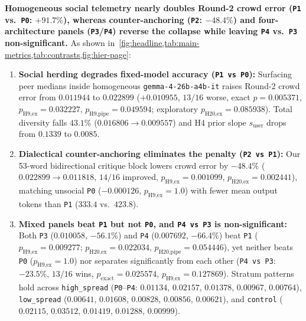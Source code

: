 \documentclass[11pt,letterpaper]{article}
\theoremstyle{plain}
\newcommand{\code}[1]{\nolinkurl{#1}}
\begin{document}
\noindent\textbf{Homogeneous social telemetry nearly doubles Round-2 crowd error (\texttt{P1} vs.\ \texttt{P0}: $+91.7\%$), whereas counter-anchoring (\texttt{P2}: $-48.4\%$) and four-architecture panels (\texttt{P3}/\texttt{P4}) reverse the collapse while leaving \texttt{P4} vs.\ \texttt{P3} non-significant.} As shown in~\cref{fig:headline,tab:main-metrics,tab:contrasts,fig:hier-page}:
\begin{enumerate}
  \item \textbf{Social herding degrades fixed-model accuracy (\texttt{P1 vs P0}):} Surfacing peer medians inside homogeneous \texttt{gemma-4-26b-a4b-it} raises Round-2 crowd error from $0.011944$ to $0.022899$ ($+0.010955$, $13/16$ worse, exact $p=0.005371$, $p_{\text{H9,ex}}=0.032227$, $p_{\text{H9,pipe}}=0.049594$; exploratory $p_{\text{H20,ex}}=0.085938$). Total diversity falls $43.1\%$ ($0.016806 \to 0.009557$) and H4 prior slope $s_{\text{user}}$ drops from $0.1339$ to $0.0085$.
  \item \textbf{Dialectical counter-anchoring eliminates the penalty (\texttt{P2 vs P1}):} Our 53-word bidirectional critique block lowers crowd error by $-48.4\%$ ($0.022899 \to 0.011818$, $14/16$ improved, $p_{\text{H9,ex}}=0.001099$, $p_{\text{H20,ex}}=0.002441$), matching unsocial \texttt{P0} ($-0.000126$, $p_{\text{H9,ex}}=1.0$) with fewer mean output tokens than \texttt{P1} ($333.4$ vs.\ $423.8$).
  \item \textbf{Mixed panels beat \texttt{P1} but not \texttt{P0}, and \texttt{P4 vs P3} is non-significant:} Both \texttt{P3} ($0.010058$, $-56.1\%$) and \texttt{P4} ($0.007692$, $-66.4\%$) beat \texttt{P1} ($p_{\text{H9,ex}}=0.009277$; $p_{\text{H20,ex}}=0.022034$, $p_{\text{H20,pipe}}=0.054446$), yet neither beats \texttt{P0} ($p_{\text{H9,ex}}=1.0$) nor separates significantly from each other (\texttt{P4 vs P3}: $-23.5\%$, $13/16$ wins, $p_{\text{exact}}=0.025574$, $p_{\text{H9,ex}}=0.127869$). Stratum patterns hold across \code{high\_spread} (\texttt{P0}--\texttt{P4}: $0.01134$, $0.02157$, $0.01378$, $0.00967$, $0.00764$), \code{low\_spread} ($0.00641$, $0.01608$, $0.00828$, $0.00856$, $0.00621$), and \code{control} ($0.02115$, $0.03512$, $0.01419$, $0.01288$, $0.00999$).
\end{enumerate}
\end{document}
